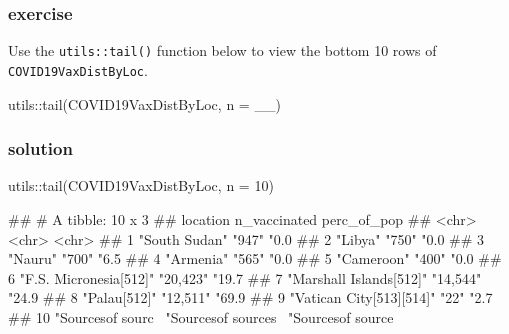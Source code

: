 \documentclass[11pt,]{article}
\newenvironment{Shaded}{\begin{snugshade}}{\end{snugshade}}
\newcommand{\AttributeTok}[1]{\textcolor[rgb]{0.77,0.63,0.00}{#1}}
\newcommand{\DecValTok}[1]{\textcolor[rgb]{0.00,0.00,0.81}{#1}}
\newcommand{\FunctionTok}[1]{\textcolor[rgb]{0.00,0.00,0.00}{#1}}
\newcommand{\NormalTok}[1]{#1}
\newcommand{\SpecialCharTok}[1]{\textcolor[rgb]{0.00,0.00,0.00}{#1}}
\let\oldShaded\Shaded
\let\endoldShaded\endShaded
\renewenvironment{Shaded}{\footnotesize\oldShaded}{\endoldShaded}
\let\oldverbatim\verbatim
\let\endoldverbatim\endverbatim
\renewenvironment{verbatim}{\footnotesize\oldverbatim}{\endoldverbatim}
\begin{document}
\hypertarget{exercise}{%
\subsubsection{exercise}\label{exercise}}

Use the \texttt{utils::tail()} function below to view the bottom 10 rows
of \texttt{COVID19VaxDistByLoc}.

\begin{Shaded}
\begin{Highlighting}[]
\NormalTok{utils}\SpecialCharTok{::}\FunctionTok{tail}\NormalTok{(COVID19VaxDistByLoc, }\AttributeTok{n =}\NormalTok{ \_\_)}
\end{Highlighting}
\end{Shaded}

\hypertarget{solution}{%
\subsubsection{solution}\label{solution}}

\begin{Shaded}
\begin{Highlighting}[]
\NormalTok{utils}\SpecialCharTok{::}\FunctionTok{tail}\NormalTok{(COVID19VaxDistByLoc, }\AttributeTok{n =} \DecValTok{10}\NormalTok{)}
\end{Highlighting}
\end{Shaded}

\begin{verbatim}
## # A tibble: 10 x 3
##    location                 n_vaccinated               perc_of_pop              
##    <chr>                    <chr>                      <chr>                    
##  1 "South Sudan"            "947"                      "0.0%"                   
##  2 "Libya"                  "750"                      "0.0%"                   
##  3 "Nauru"                  "700"                      "6.5%"                   
##  4 "Armenia"                "565"                      "0.0%"                   
##  5 "Cameroon"               "400"                      "0.0%"                   
##  6 "F.S. Micronesia[512]"   "20,423"                   "19.7%"                  
##  7 "Marshall Islands[512]"  "14,544"                   "24.9%"                  
##  8 "Palau[512]"             "12,511"                   "69.9%"                  
##  9 "Vatican City[513][514]" "22"                       "2.7%"                   
## 10 "Sources\nList of sourc~ "Sources\nList of sources~ "Sources\nList of source~
\end{verbatim}
\end{document}
